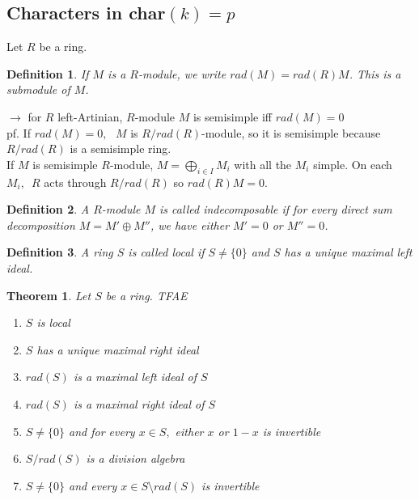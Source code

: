 \documentclass[12pt,letterpaper]{report}
\newtheorem{definition}{Definition}[section]
\newtheorem{theorem}{Theorem}[section]
\begin{document}
\subsection{Characters in char$(k)=p$}


Let $R$ be a ring.
\begin{definition}If $M$ is a $R$-module, we write $rad(M)=rad(R)M$. This is a submodule of $M$.\end{definition}
$\rightarrow $ for $R$ left-Artinian, $R$-module $M$ is semisimple iff $rad(M)=0$
\\pf. If $rad(M)=0,\,\,\,\,M$ is $R/rad(R)$-module, so it is semisimple because $R/rad(R)$ is a semisimple ring.
\\If $M$ is semisimple $R$-module, $M=\bigoplus_{i\in I}M_{i}$ with all the $M_{i}$ simple. On each $M_{i},\,\,\,R$ acts through $R/rad(R)$ so $rad(R)M=0$.
\begin{definition}A $R$-module $M$ is called indecomposable if for every direct sum decomposition $M=M'\oplus M''$, we have either $M'=0$ or $M''=0$.\end{definition}
\begin{definition}A ring $S$ is called local if $S\neq\{0\}$ and $S$ has a unique maximal left ideal.\end{definition}
\begin{theorem}Let $S$ be a ring. TFAE\begin{enumerate}
\item $S$ is local\item $S$ has a unique maximal right ideal\item $rad(S)$ is a maximal left ideal of $S$\item $rad(S)$ is a maximal right ideal of $S$\item $S\neq\{0\}$ and for every $x\in S,$ either $x$ or $1-x$ is invertible\item$S/rad(S)$ is a division algebra\item $S\neq\{0\}$ and every $x\in S\setminus rad(S)$ is invertible\end{enumerate}
\end{theorem}
\end{document}
